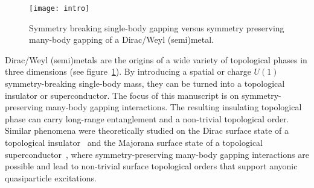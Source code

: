 
\begin{figure}[htbp]
\texttt{[image: intro]}
\caption{Symmetry breaking single-body gapping versus symmetry preserving many-body gapping of a Dirac/Weyl (semi)metal.}\label{fig:intro}
\end{figure}

Dirac/Weyl (semi)metals are the origins of a wide variety of topological phases in three dimensions (see figure~\ref{fig:intro}). By introducing a spatial or charge $U(1)$ symmetry-breaking single-body mass, they can be turned into a topological insulator or superconductor. The focus of this manuscript is on symmetry-preserving many-body gapping interactions. The resulting insulating topological phase can carry long-range entanglement and a non-trivial topological order. Similar phenomena were theoretically studied on the Dirac surface state of a topological insulator~\cite{WangPotterSenthilgapTI13,MetlitskiKaneFisher13b,ChenFidkowskiVishwanath14,BondersonNayakQi13} and the Majorana surface state of a topological superconductor~\cite{LukaszChenVishwanath,MetlitskiFidkowskiChenVishwanath14}, where symmetry-preserving many-body gapping interactions are possible and lead to non-trivial surface topological orders that support anyonic quasiparticle excitations.

